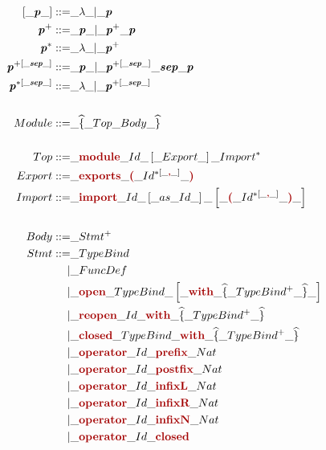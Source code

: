 {\begin{implementationfr}
{\newcommand{\scope}[1]{\widehat{\{} \_ #1 \_ \widehat{\}}}
\newcommand{\parens}[1]{\lt{(} \_ #1 \_ \lt{)}}
\newcommand{\scolon}{\widehat{;}}

\allowdisplaybreaks
\footnotesize
\begin{align*}
\maybe{\emph{p}} ::=& \_ \lambda \_ | \_ \emph{p}
\\
\list{\emph{p}} ::=& \_ \emph{p} \_ | \_ \emph{p}^{+} \_ \emph{p}
\\
\listZ{\emph{p}} ::=& \_ \lambda \_ | \_ \emph{p}^{+}
\\
\listSep{\emph{p}}{\emph{sep}} ::=
    & \_ \emph{p} \_
    | \_ \listSep{\emph{p}}{\emph{sep}} \_ \emph{sep} \_ \emph{p}
\\
\listSepZ{\emph{p}}{\emph{sep}} ::=
    & \_ \lambda \_
    | \_ \listSep{\emph{p}}{\emph{sep}}
\\
\\
Module ::=& \_ \scope{Top \_ Body}
\\
\\
Top ::=& \_ \lt{module} \_ Id \_ \maybe{Export} \_ \listZ{Import}
\\
Export ::=& \_ \lt{exports} \_ \parens{\listSepZ{Id}{\lt{,}}}
\\
Import ::=& \_ \lt{import} \_ Id \_ \maybe{as \_ Id} \_
    \maybe{\parens{\listSepZ{Id}{\lt{,}}}}
\\
\\
Body ::=& \_ \list{Stmt}
\\
Stmt ::=
     & \_ TypeBind
\\
    |& \_ FuncDef
\\
    |& \_ \lt{open} \_ TypeBind \_
        \maybe{ \lt{with} \_ \scope{\list{TypeBind}} }
\\
    |& \_ \lt{reopen} \_ Id \_  \lt{with} \_
        \scope{\list{TypeBind}}
\\
    |& \_ \lt{closed} \_ TypeBind \_  \lt{with} \_
        \scope{\list{TypeBind}}
\\
    |& \_ \lt{operator} \_ Id \_ \lt{prefix}  \_ Nat
\\
    |& \_ \lt{operator} \_ Id \_ \lt{postfix} \_ Nat
\\
    |& \_ \lt{operator} \_ Id \_ \lt{infixL}  \_ Nat
\\
    |& \_ \lt{operator} \_ Id \_ \lt{infixR}  \_ Nat
\\
    |& \_ \lt{operator} \_ Id \_ \lt{infixN}  \_ Nat
\\
    |& \_ \lt{operator} \_ Id \_ \lt{closed}
\\

\end{align*}}
\end{implementationfr}}
